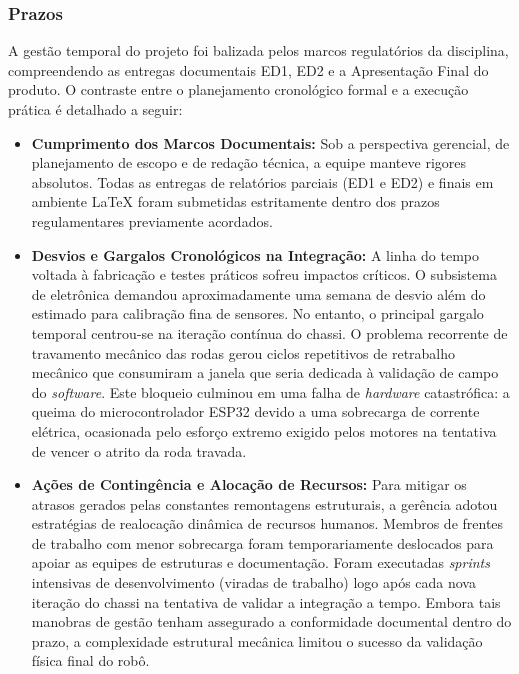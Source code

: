 \subsubsection{Prazos}
\label{subsubsec:prazos_proj}

A gestão temporal do projeto foi balizada pelos marcos regulatórios da disciplina, compreendendo as entregas documentais ED1, ED2 e a Apresentação Final do produto. O contraste entre o planejamento cronológico formal e a execução prática é detalhado a seguir:

\begin{itemize}
    \item \textbf{Cumprimento dos Marcos Documentais:} Sob a perspectiva gerencial, de planejamento de escopo e de redação técnica, a equipe manteve rigores absolutos. Todas as entregas de relatórios parciais (ED1 e ED2) e finais em ambiente \LaTeX{} foram submetidas estritamente dentro dos prazos regulamentares previamente acordados.
    
    \item \textbf{Desvios e Gargalos Cronológicos na Integração:} A linha do tempo voltada à fabricação e testes práticos sofreu impactos críticos. O subsistema de eletrônica demandou aproximadamente uma semana de desvio além do estimado para calibração fina de sensores. No entanto, o principal gargalo temporal centrou-se na iteração contínua do chassi. O problema recorrente de travamento mecânico das rodas gerou ciclos repetitivos de retrabalho mecânico que consumiram a janela que seria dedicada à validação de campo do \textit{software}. Este bloqueio culminou em uma falha de \textit{hardware} catastrófica: a queima do microcontrolador ESP32 devido a uma sobrecarga de corrente elétrica, ocasionada pelo esforço extremo exigido pelos motores na tentativa de vencer o atrito da roda travada.
    
    \item \textbf{Ações de Contingência e Alocação de Recursos:} Para mitigar os atrasos gerados pelas constantes remontagens estruturais, a gerência adotou estratégias de realocação dinâmica de recursos humanos. Membros de frentes de trabalho com menor sobrecarga foram temporariamente deslocados para apoiar as equipes de estruturas e documentação. Foram executadas \textit{sprints} intensivas de desenvolvimento (viradas de trabalho) logo após cada nova iteração do chassi na tentativa de validar a integração a tempo. Embora tais manobras de gestão tenham assegurado a conformidade documental dentro do prazo, a complexidade estrutural mecânica limitou o sucesso da validação física final do robô.
\end{itemize}

